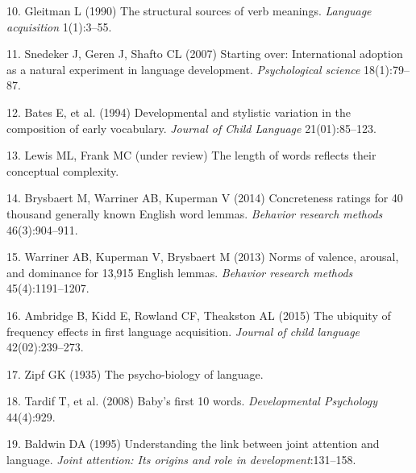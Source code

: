 \documentclass[9pt,twocolumn,twoside]{pnas-new}
\begin{document}
\hypertarget{ref-gleitman1990}{}
10. Gleitman L (1990) The structural sources of verb meanings.
\emph{Language acquisition} 1(1):3--55.

\hypertarget{ref-snedeker2007}{}
11. Snedeker J, Geren J, Shafto CL (2007) Starting over: International
adoption as a natural experiment in language development.
\emph{Psychological science} 18(1):79--87.

\hypertarget{ref-bates1994}{}
12. Bates E, et al. (1994) Developmental and stylistic variation in the
composition of early vocabulary. \emph{Journal of Child Language}
21(01):85--123.

\hypertarget{ref-lewisunderreview}{}
13. Lewis ML, Frank MC (under review) The length of words reflects their
conceptual complexity.

\hypertarget{ref-brysbaert2014}{}
14. Brysbaert M, Warriner AB, Kuperman V (2014) Concreteness ratings for
40 thousand generally known English word lemmas. \emph{Behavior research
methods} 46(3):904--911.

\hypertarget{ref-warriner2013}{}
15. Warriner AB, Kuperman V, Brysbaert M (2013) Norms of valence,
arousal, and dominance for 13,915 English lemmas. \emph{Behavior
research methods} 45(4):1191--1207.

\hypertarget{ref-ambridge2015}{}
16. Ambridge B, Kidd E, Rowland CF, Theakston AL (2015) The ubiquity of
frequency effects in first language acquisition. \emph{Journal of child
language} 42(02):239--273.

\hypertarget{ref-zipf1935}{}
17. Zipf GK (1935) The psycho-biology of language.

\hypertarget{ref-tardif2008}{}
18. Tardif T, et al. (2008) Baby's first 10 words. \emph{Developmental
Psychology} 44(4):929.

\hypertarget{ref-baldwin1995}{}
19. Baldwin DA (1995) Understanding the link between joint attention and
language. \emph{Joint attention: Its origins and role in
development}:131--158.



% 
\end{document}
